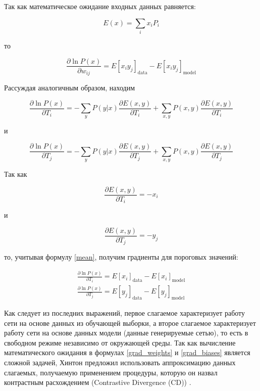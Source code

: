 Так как математическое ожидание входных данных равняется:
	
\begin{equation}
		\label{mean}
		E(x)=\sum_i x_iP_i
\end{equation}	  
	
то
	
\begin{equation}
    \label{grad_weights}
	\frac{\partial \ln P(x)}{\partial w_{ij}}=E\left[x_iy_j\right]_{\text{data}}-E\left[x_iy_j\right]_{\text{model}}
\end{equation}
	
Рассуждая аналогичным образом, находим
	
\begin{equation*}
	\frac{\partial \ln P(x)}{\partial T_{i}}=-\sum_y P(y \lvert x)\frac{\partial E(x,y)}{\partial T_{i}} + \sum_{x,y} P(x,y)\frac{\partial E(x,y)}{\partial T_{i}}
\end{equation*}
	
и
	
\begin{equation*}
	\frac{\partial \ln P(x)}{\partial T_{j}}=-\sum_y P(y \lvert x)\frac{\partial E(x,y)}{\partial T_{j}} + \sum_{x,y} P(x,y)\frac{\partial E(x,y)}{\partial T_{j}}
\end{equation*}
	
Так как
	
\begin{equation*}
	\frac{\partial E(x,y)}{\partial T_{i}}=-x_i 
\end{equation*}
	
и 
	
\begin{equation*}
	\frac{\partial E(x,y)}{\partial T_{j}}=-y_j 
\end{equation*}
	
то, учитывая формулу \ref{mean}, получим градиенты для пороговых значений:
	
\begin{equation}
\label{grad_biases}
\begin{aligned}
	\frac{\partial \ln P(x)}{\partial T_i}=E\left[x_i\right]_{\text{data}}-E\left[x_i\right]_{\text{model}}\\
	\frac{\partial \ln P(x)}{\partial T_j}=E\left[y_j\right]_{\text{data}}-E\left[y_j\right]_{\text{model}}
\end{aligned}
\end{equation}
	
Как следует из последних выражений, первое слагаемое характеризует работу сети на основе данных из обучающей выборки, а  второе слагаемое характеризует работу сети на основе данных модели (данные генерируемые сетью), то есть в свободном режиме независимо от окружающей среды.
Так как вычисление математического ожидания в формулах \ref{grad_weights} и \ref{grad_biases} является сложной задачей, Хинтон предложил использовать аппроксимацию данных слагаемых, получаемую применением процедуры, которую он назвал контрастным расхождением (Contrastive Divergence (CD)) \cite{n1}.
	
